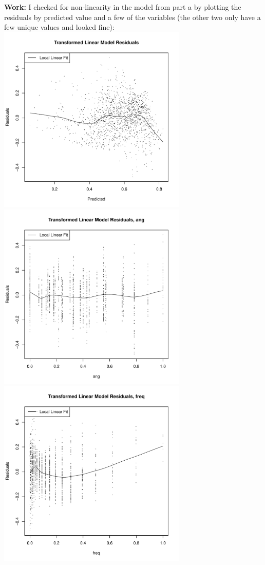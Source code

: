 \documentclass[11pt]{article}
\theoremstyle{definition}
\begin{document}
\begin{itemize}
\begin{itemize}
                {\bf Work:} I checked for non-linearity in the model from part a by plotting the residuals by predicted value and a few of the variables (the other two only have a few unique values and looked fine): \\
                \includegraphics[width=9cm]{final/1b_res_plot_lm2} 
                \includegraphics[width=9cm]{final/1b_res_plot_tran_ang} \\ 
                \includegraphics[width=9cm]{final/1b_res_plot_tran_freq}  

\end{itemize}
\end{itemize}
\end{document}
